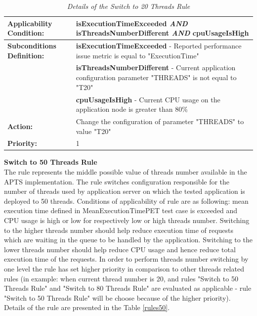 \documentclass[10pt,a4paper]{article}
\begin{document}
\begin{table}[!htb]
\def\arraystretch{1.5}
\caption{\textit{Details of the Switch to 20 Threads Rule}} \label{rules20}
\begin{tabularx}{\textwidth}{p{2.1cm}|X}

\textbf{Applicability Condition:} & \textbf{isExecutionTimeExceeded} \textit{AND} \newline
\textbf{isThreadsNumberDifferent} \textit{AND} \newline
\textbf{cpuUsageIsHigh} \\ \hline

\textbf{Subconditions Definition:} & \textbf{isExecutionTimeExceeded} -  Reported performance issue metric is equal to "ExecutionTime"  \\
& \textbf{isThreadsNumberDifferent} -  Current application configuration parameter "THREADS" is not equal to "T20" \\
& \textbf{cpuUsageIsHigh} - Current CPU usage on the application node is greater than 80\% \\ \hline

\textbf{Action:} & Change the configuration of parameter "THREADS" to value "T20" \\ \hline
\textbf{Priority:} & 1\\
\end{tabularx}
\end{table}
\vspace{5mm}
\noindent\textbf{Switch to 50 Threads Rule} \\
The rule represents the middle possible value of threads number available in the APTS implementation. The rule switches configuration responsible for the number of threads used by application server on which the tested application is deployed to 50 threads. Conditions of applicability of rule are as following: mean execution time defined in MeanExecutionTimePET test case is exceeded and CPU usage is high or low for respectively low or high threads number. Switching to the higher threads number should help reduce execution time of requests which are waiting in the queue to be handled by the application. Switching to the lower threads number should help reduce CPU usage and hence reduce total execution time of the requests. In order to perform threads number switching by one level the rule has set higher priority in comparison to other threads related rules (in example: when current thread number is 20, and rules "Switch to 50 Threads Rule" and "Switch to 80 Threads Rule" are evaluated as applicable - rule "Switch to 50 Threads Rule" will be choose because of the higher priority). Details of the rule are presented in the Table \ref{rules50}.
\end{document}
